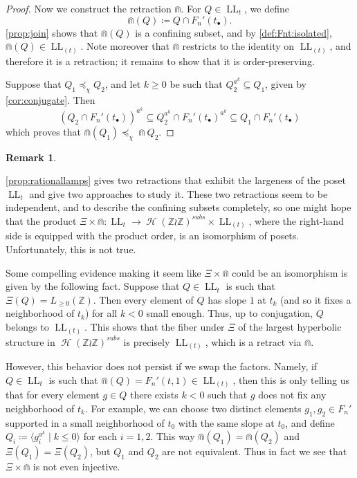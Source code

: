 \documentclass[reqno,12pt]{amsart}\setcounter{tocdepth}{1}
\theoremstyle{definition}
\newtheorem{remark}[theorem]{Remark}
\newcommand{\Z}{\mathbb{Z}}
\DeclareMathOperator{\Hyp}{\mathcal{H}}
\DeclareMathOperator{\LL}{LL}
\numberwithin{equation}{section}
\begin{document}
\begin{proof}
\medskip

Now we construct the retraction $\Cap$. For $Q \in \LL_t$, we define
\[
\Cap(Q) \coloneqq Q \cap F_n'(t_\bullet).
\]
\cref{prop:join}  shows that $\Cap(Q)$ is a confining subset, and by \cref{def:Fnt:isolated}, $\Cap(Q) \in \LL_{(t)}$. Note moreover that $\Cap$ restricts to the identity on $\LL_{(t)}$, and therefore it is a retraction; it remains to show that it is order-preserving.

Suppose that $Q_1 \preceq_\chi Q_2$, and let $k \geq 0$ be such that $Q_2^{a^k} \subseteq Q_1$, given by \cref{cor:conjugate}. Then
\[(Q_2 \cap F_n'(t_\bullet))^{a^k} \subseteq Q_2^{a^k} \cap F_n'(t_\bullet)^{a^k} \subseteq Q_1 \cap F_n'(t_\bullet)\]
which proves that $\Cap(Q_1) \preceq_\chi \Cap Q_2$.
\end{proof}

\begin{remark}
\label{rem:injectivity:rational}

\cref{prop:rationallamps} gives two retractions that exhibit the largeness of the poset $\LL_t$ and give two approaches to study it. These two retractions seem to be independent, and to describe the confining subsets completely, so one might hope that the product $\Xi \times \Cap \colon \LL_t \to \Hyp(\Z \wr \Z)^{subs} \times \LL_{(t)}$, where the right-hand side is equipped with the product order, is an isomorphism of posets. Unfortunately, this is not true.

Some compelling evidence making it seem like $\Xi\times\Cap$ could be an isomorphism is given by the following fact. Suppose that $Q \in \LL_t$ is such that $\Xi(Q) = L_{\geq 0}(\Z)$. Then every element of $Q$ has slope $1$ at $t_k$ (and so it fixes a neighborhood of $t_k$) for all $k < 0$ small enough. Thus, up to conjugation, $Q$ belongs to $\LL_{(t)}$. This shows that the fiber under $\Xi$ of the largest hyperbolic structure in $\Hyp(\Z \wr \Z)^{subs}$ is precisely $\LL_{(t)}$, which is a retract via $\Cap$.

However, this behavior does not persist if we swap the factors. Namely, if $Q \in \LL_t$ is such that $\Cap(Q) = F_n'(t, 1) \in \LL_{(t)}$, then this is only telling us that for every element $g \in Q$ there exists $k < 0$ such that $g$ does not fix any neighborhood of $t_k$. For example, we can choose two distinct elements $g_1, g_2 \in F_n'$ supported in a small neighborhood of $t_0$ with the same slope at $t_0$, and define $Q_i \coloneqq \langle g_i^{a^k} \mid k \leq 0 \rangle$ for each $i=1,2$. This way $\Cap(Q_1) = \Cap(Q_2)$ and $\Xi(Q_1) = \Xi(Q_2)$, but $Q_1$ and $Q_2$ are not equivalent. Thus in fact we see that $\Xi \times \Cap$ is not even injective.
\end{remark}
\end{document}
